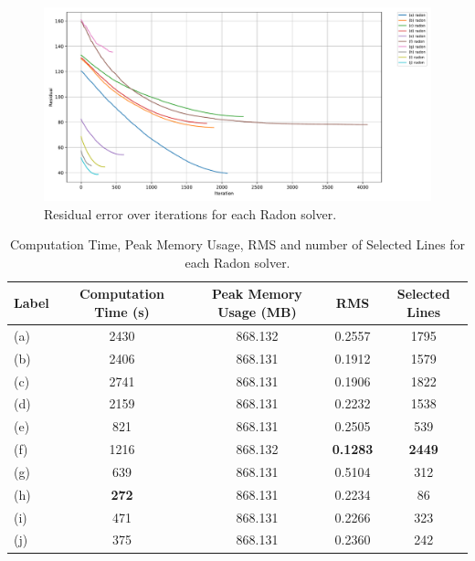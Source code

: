 \begin{figure}[H]
    \centering
    \includegraphics[width=\linewidth]{images/radon/residual_history.pdf}
    \caption{Residual error over iterations for each Radon solver.}
    \label{fig:radon_norm_error}
\end{figure}

\begin{table}[!ht]
\centering
\caption{Computation Time, Peak Memory Usage, RMS and number of Selected Lines for each Radon solver.}
\begin{tabularx}{\textwidth}{l C C C C}
\toprule
\textbf{Label} & \textbf{Computation Time (s)} & \textbf{Peak Memory Usage (MB)} & \textbf{RMS} & \textbf{Selected Lines} \\
\midrule
(a) & 2430            & 868.132            & 0.2557            & 1795 \\
(b) & 2406            & 868.131            & 0.1912            & 1579 \\
(c) & 2741            & 868.131            & 0.1906            & 1822 \\
(d) & 2159            & 868.131            & 0.2232            & 1538 \\
(e) &  821            & 868.131            & 0.2505            &  539 \\
(f) & 1216            & 868.132            & \textbf{0.1283}   & \textbf{2449} \\
(g) &  639            & 868.131            & 0.5104            &  312 \\
(h) &  \textbf{272}   & 868.131            & 0.2234            &   86 \\
(i) &  471            & 868.131            & 0.2266            &  323 \\
(j) &  375            & 868.131            & 0.2360            &  242 \\
\bottomrule
\end{tabularx}
\end{table}